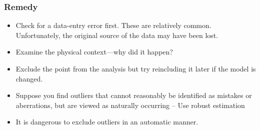 \documentclass[10pt]{beamer} %
\begin{document}
\begin{frame}
   \frametitle{Remedy}
   \begin{itemize}
      \item Check for a data-entry error first. These are relatively common.
         Unfortunately, the original source of the data may have been lost. 
      \item Examine the physical context—why did it happen?
      \item Exclude the point from the analysis but try reincluding it later if
         the model is changed. 
      \item Suppose you find outliers that cannot reasonably be identified as
         mistakes or aberrations, but are viewed as naturally occurring -- Use
         robust estimation
      \item It is dangerous to exclude outliers in an automatic manner.
   \end{itemize}
\end{frame}
\end{document}
